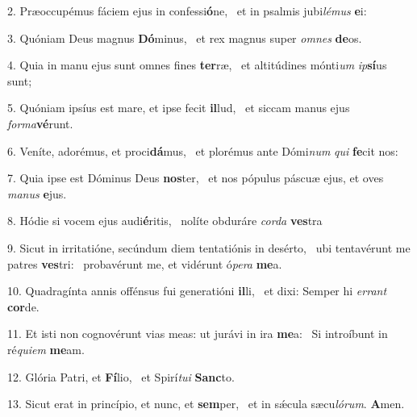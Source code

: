 2. Præoccupémus fáciem ejus in confessi\textbf{ó}ne, \ast\  et in psalmis jubi\textit{lé}\textit{mus} \textbf{e}i:\

3. Quóniam Deus magnus \textbf{Dó}minus, \ast\  et rex magnus super \textit{om}\textit{nes} \textbf{de}os.\

4. Quia in manu ejus sunt omnes fines \textbf{ter}ræ, \ast\  et altitúdines mónti\textit{um} \textit{ip}\textbf{sí}us sunt;\

5. Quóniam ipsíus est mare, et ipse fecit \textbf{il}lud, \ast\  et siccam manus ejus \textit{for}\textit{ma}\textbf{vé}runt.\

6. Veníte, adorémus, et proci\textbf{dá}mus, \ast\  et plorémus ante Dómi\textit{num} \textit{qui} \textbf{fe}cit nos:\

7. Quia ipse est Dóminus Deus \textbf{nos}ter, \ast\  et nos pópulus páscuæ ejus, et oves \textit{ma}\textit{nus} \textbf{e}jus.\

8. Hódie si vocem ejus audi\textbf{é}ritis, \ast\  nolíte obduráre \textit{cor}\textit{da} \textbf{ves}tra\

9. Sicut in irritatióne, secúndum diem tentatiónis in desérto, \dag\  ubi tentavérunt me patres \textbf{ves}tri: \ast\  probavérunt me, et vidérunt ó\textit{pe}\textit{ra} \textbf{me}a.\

10. Quadragínta annis offénsus fui generatióni \textbf{il}li, \ast\  et dixi: Semper hi \textit{er}\textit{rant} \textbf{cor}de.\

11. Et isti non cognovérunt vias meas: ut jurávi in ira \textbf{me}a: \ast\  Si introíbunt in ré\textit{qui}\textit{em} \textbf{me}am.\

12. Glória Patri, et \textbf{Fí}lio, \ast\  et Spirí\textit{tu}\textit{i} \textbf{Sanc}to.\

13. Sicut erat in princípio, et nunc, et \textbf{sem}per, \ast\  et in sǽcula sæcu\textit{ló}\textit{rum}. \textbf{A}men.\

